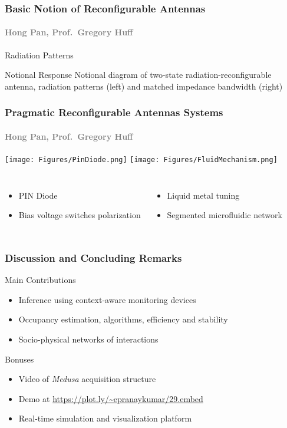 \documentclass{beamer}
\begin{document}
\begin{frame}
\frametitle{Basic Notion of Reconfigurable Antennas}
\framesubtitle{\textcolor{gray}{\scriptsize Hong Pan, Prof.~Gregory Huff}}
\begin{block}{Radiation Patterns}
  \begin{center}
  \scalebox{0.92}{}
  \hfill
  \scalebox{0.8}{}
  \end{center}
\end{block}
\begin{block}{Notional Response}
  Notional diagram of two-state radiation-reconfigurable antenna,
  radiation patterns (left) and matched impedance bandwidth (right)
\end{block}
\end{frame}

\begin{frame}
\frametitle{Pragmatic Reconfigurable Antennas Systems}
\framesubtitle{\textcolor{gray}{\scriptsize Hong Pan, Prof.~Gregory Huff }}
  \texttt{[image: Figures/PinDiode.png]}
  \hfill
  \texttt{[image: Figures/FluidMechanism.png]}
\begin{columns}
  \begin{itemize}
    \item PIN Diode
    \item Bias voltage switches polarization
  \end{itemize}
  \begin{itemize}
    \item Liquid metal tuning
    \item Segmented microfluidic network
  \end{itemize}
\end{columns}
\end{frame}


\begin{frame}
  \frametitle{Discussion and Concluding Remarks}

    \begin{block}{Main Contributions}
    \begin{itemize}
    \item Inference using context-aware monitoring devices
    \item Occupancy estimation, algorithms, efficiency and stability
    \item Socio-physical networks of interactions
    \end{itemize}
    \end{block}

    \begin{block}{Bonuses}
    \begin{itemize}
    \item Video of \emph{Medusa} acquisition structure
    \item Demo at \url{https://plot.ly/~epranaykumar/29.embed}
    \item Real-time simulation and visualization platform
    \end{itemize}
    \end{block}
\end{frame}
\end{document}
